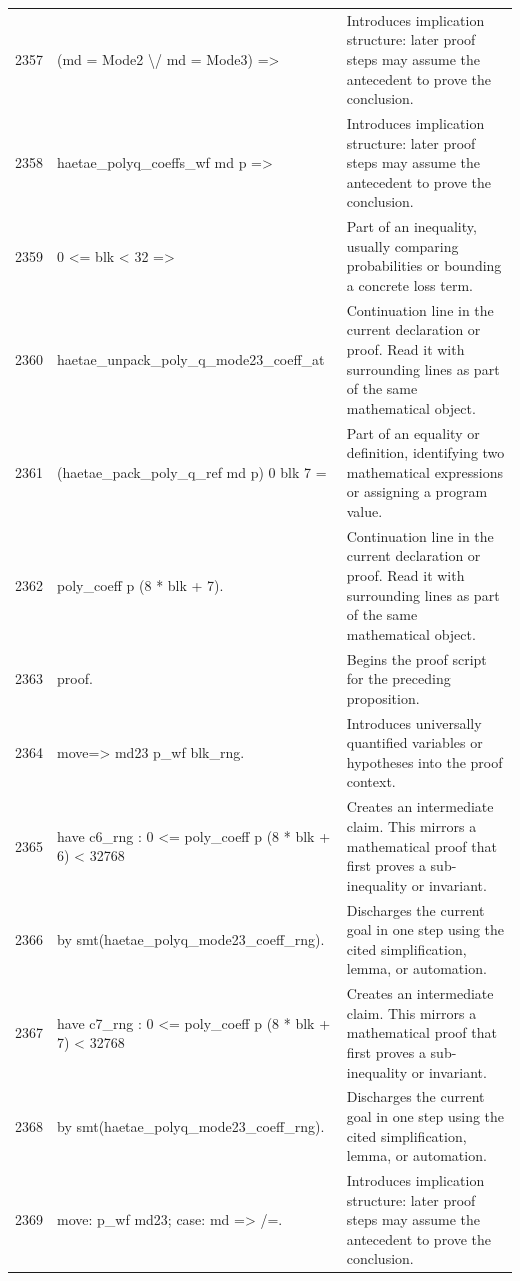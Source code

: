 \documentclass[10pt]{article}
\begin{document}
\begin{longtable}{r L{0.53\textwidth} L{0.37\textwidth}}
2357 & {\ttfamily\scriptsize   (md = Mode2 \textbackslash{}/ md = Mode3) =>} & Introduces implication structure: later proof steps may assume the antecedent to prove the conclusion. \\
2358 & {\ttfamily\scriptsize   haetae\_polyq\_coeffs\_wf md p =>} & Introduces implication structure: later proof steps may assume the antecedent to prove the conclusion. \\
2359 & {\ttfamily\scriptsize   0 <= blk < 32 =>} & Part of an inequality, usually comparing probabilities or bounding a concrete loss term. \\
2360 & {\ttfamily\scriptsize   haetae\_unpack\_poly\_q\_mode23\_coeff\_at} & Continuation line in the current declaration or proof.  Read it with surrounding lines as part of the same mathematical object. \\
2361 & {\ttfamily\scriptsize     (haetae\_pack\_poly\_q\_ref md p) 0 blk 7 =} & Part of an equality or definition, identifying two mathematical expressions or assigning a program value. \\
2362 & {\ttfamily\scriptsize   poly\_coeff p (8 * blk + 7).} & Continuation line in the current declaration or proof.  Read it with surrounding lines as part of the same mathematical object. \\
2363 & {\ttfamily\scriptsize proof.} & Begins the proof script for the preceding proposition. \\
2364 & {\ttfamily\scriptsize move=> md23 p\_wf blk\_rng.} & Introduces universally quantified variables or hypotheses into the proof context. \\
2365 & {\ttfamily\scriptsize have c6\_rng : 0 <= poly\_coeff p (8 * blk + 6) < 32768} & Creates an intermediate claim.  This mirrors a mathematical proof that first proves a sub-inequality or invariant. \\
2366 & {\ttfamily\scriptsize   by smt(haetae\_polyq\_mode23\_coeff\_rng).} & Discharges the current goal in one step using the cited simplification, lemma, or automation. \\
2367 & {\ttfamily\scriptsize have c7\_rng : 0 <= poly\_coeff p (8 * blk + 7) < 32768} & Creates an intermediate claim.  This mirrors a mathematical proof that first proves a sub-inequality or invariant. \\
2368 & {\ttfamily\scriptsize   by smt(haetae\_polyq\_mode23\_coeff\_rng).} & Discharges the current goal in one step using the cited simplification, lemma, or automation. \\
2369 & {\ttfamily\scriptsize move: p\_wf md23; case: md => /=.} & Introduces implication structure: later proof steps may assume the antecedent to prove the conclusion. \\

\end{longtable}
\end{document}
